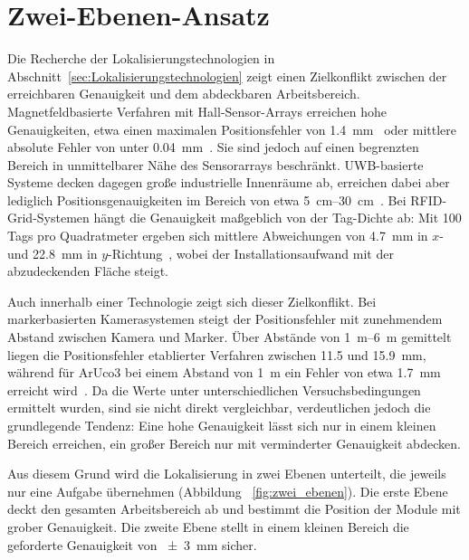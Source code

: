 \section{Zwei-Ebenen-Ansatz}
\label{sec:Zwei-Ebenen-Ansatz}
Die Recherche der Lokalisierungstechnologien in Abschnitt~\ref{sec:Lokalisierungstechnologien} zeigt einen Zielkonflikt zwischen der erreichbaren Genauigkeit und dem abdeckbaren Arbeitsbereich. Magnetfeldbasierte Verfahren mit Hall-Sensor-Arrays erreichen hohe Genauigkeiten, etwa einen maximalen Positionsfehler von \SI{1,4}{\milli\metre}~\cite{KawatoKim2005} oder mittlere absolute Fehler von unter \SI{0,04}{\milli\metre}~\cite{Nemeth2025Hall}. Sie sind jedoch auf einen begrenzten Bereich in unmittelbarer Nähe des Sensorarrays beschränkt. UWB-basierte Systeme decken dagegen große industrielle Innenräume ab, erreichen dabei aber lediglich Positionsgenauigkeiten im Bereich von etwa \SIrange{5}{30}{\centi\metre}~\cite{Elsanhoury2022}. Bei RFID-Grid-Systemen hängt die Genauigkeit maßgeblich von der Tag-Dichte ab: Mit 100 Tags pro Quadratmeter ergeben sich mittlere Abweichungen von \SI{4,7}{\milli\metre} in $x$- und \SI{22,8}{\milli\metre} in $y$-Richtung~\cite{MiTakahashi2016}, wobei der Installationsaufwand mit der abzudeckenden Fläche steigt.



Auch innerhalb einer Technologie zeigt sich dieser Zielkonflikt. Bei markerbasierten Kamerasystemen steigt der Positionsfehler mit zunehmendem Abstand zwischen Kamera und Marker. Über Abstände von \SIrange{1}{6}{\metre} gemittelt liegen die Positionsfehler etablierter Verfahren zwischen \num{11,5} und \SI{15,9}{\milli\metre}, während für ArUco3 bei einem Abstand von \SI{1}{\metre} ein Fehler von etwa \SI{1,7}{\milli\metre} erreicht wird~\cite{JuradoRodriguez2023}. Da die Werte unter unterschiedlichen Versuchsbedingungen ermittelt wurden, sind sie nicht direkt vergleichbar, verdeutlichen jedoch die grundlegende Tendenz: Eine hohe Genauigkeit lässt sich nur in einem kleinen Bereich erreichen, ein großer Bereich nur mit verminderter Genauigkeit abdecken.

Aus diesem Grund wird die Lokalisierung in zwei Ebenen unterteilt, die jeweils nur eine Aufgabe übernehmen (Abbildung ~\ref{fig:zwei_ebenen}). Die erste Ebene deckt den gesamten Arbeitsbereich ab und bestimmt die Position der Module mit grober Genauigkeit. Die zweite Ebene stellt in einem kleinen Bereich die geforderte Genauigkeit von \SI{\pm 3}{\milli\metre} sicher.

